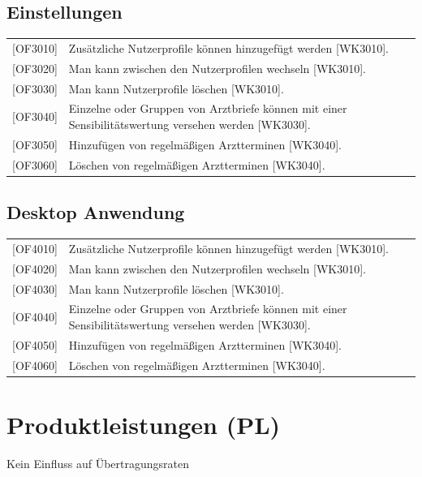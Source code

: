 \documentclass[a4paper]{scrreprt}
\begin{document}
\subsection{Einstellungen}
\begin{tabular}{lll}
[OF3010]&  \multicolumn{2}{p{12cm}}{Zusätzliche Nutzerprofile können hinzugefügt werden [WK3010].}\\
{[OF3020]} &  \multicolumn{2}{p{12cm}}{Man kann zwischen den Nutzerprofilen wechseln [WK3010].}\\
{[OF3030]} &  \multicolumn{2}{p{12cm}}{Man kann Nutzerprofile löschen [WK3010].}\\
{[OF3040]} &  \multicolumn{2}{p{12cm}}{Einzelne oder Gruppen von Arztbriefe können mit einer Sensibilitätswertung versehen werden [WK3030].}  \\
{[OF3050]} &  \multicolumn{2}{p{12cm}}{Hinzufügen von regelmäßigen Arztterminen [WK3040].}  \\
{[OF3060]} &  \multicolumn{2}{p{12cm}}{Löschen von regelmäßigen Arztterminen [WK3040].}  \\
\end{tabular}

\subsection{Desktop Anwendung}
\begin{tabular}{lll}
[OF4010]&  \multicolumn{2}{p{12cm}}{Zusätzliche Nutzerprofile können hinzugefügt werden [WK3010].}\\
{[OF4020]} &  \multicolumn{2}{p{12cm}}{Man kann zwischen den Nutzerprofilen wechseln [WK3010].}\\
{[OF4030]} &  \multicolumn{2}{p{12cm}}{Man kann Nutzerprofile löschen [WK3010].}\\
{[OF4040]} &  \multicolumn{2}{p{12cm}}{Einzelne oder Gruppen von Arztbriefe können mit einer Sensibilitätswertung versehen werden [WK3030].}  \\
{[OF4050]} &  \multicolumn{2}{p{12cm}}{Hinzufügen von regelmäßigen Arztterminen [WK3040].}  \\
{[OF4060]} &  \multicolumn{2}{p{12cm}}{Löschen von regelmäßigen Arztterminen [WK3040].}  \\
\end{tabular}


\section{Produktleistungen (PL)}
Kein Einfluss auf Übertragungsraten
\end{document}
